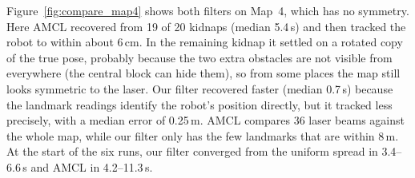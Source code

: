 \documentclass[12pt, a4paper]{article}
\begin{document}
\begin{table}[H]
    \centering
    \caption{Kidnap recovery over 20 kidnaps per map (two 330\,s runs).  Recovery time is the median over the recovered kidnaps.  Tracking error is the error after recovery, given as the median and the 10th--90th percentile range.  The one AMCL kidnap on Map~2 that is in neither row ended at a pose that was neither correct nor a rotated copy.}
    \label{tab:results}
    \small
\end{table}

Figure~\ref{fig:compare_map4} shows both filters on Map~4, which has no symmetry.  Here AMCL recovered from 19 of 20 kidnaps (median 5.4\,s) and then tracked the robot to within about 6\,cm.  In the remaining kidnap it settled on a rotated copy of the true pose, probably because the two extra obstacles are not visible from everywhere (the central block can hide them), so from some places the map still looks symmetric to the laser.  Our filter recovered faster (median 0.7\,s) because the landmark readings identify the robot's position directly, but it tracked less precisely, with a median error of 0.25\,m.  AMCL compares 36 laser beams against the whole map, while our filter only has the few landmarks that are within 8\,m.  At the start of the six runs, our filter converged from the uniform spread in 3.4--6.6\,s and AMCL in 4.2--11.3\,s.
\end{document}
